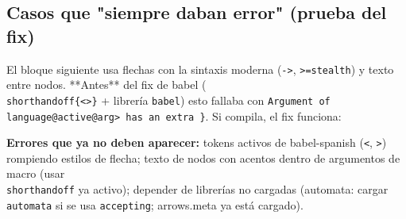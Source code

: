 \subsection{Casos que "siempre daban error" (prueba del fix)}

El bloque siguiente usa flechas con la sintaxis moderna
(\texttt{->}, \texttt{>=stealth}) y texto entre nodos. **Antes** del fix
de babel (\texttt{\\shorthandoff\{<>\}} + librería \texttt{babel}) esto
fallaba con \texttt{Argument of \\language@active@arg> has an extra \}}.
Si compila, el fix funciona:


{\footnotesize\textbf{Errores que ya no deben aparecer:} tokens activos de
babel-spanish (\texttt{<}, \texttt{>}) rompiendo estilos de flecha;
texto de nodos con acentos dentro de argumentos de macro (usar
\texttt{\\shorthandoff} ya activo); depender de librerías no cargadas
(automata: cargar \texttt{automata} si se usa \texttt{accepting};
arrows.meta ya está cargado).\par}
